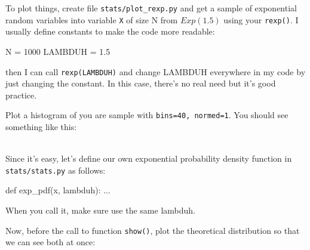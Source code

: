 \begin{fullwidth}
\step To plot things, create file {\tt stats/plot\_rexp.py} and get a sample of exponential random variables into variable {\tt X} of size N from $Exp(1.5)$ using your {\tt rexp()}. I usually define constants to make the code more readable:

\begin{pyverbatim}
N = 1000
LAMBDUH = 1.5
\end{pyverbatim}

\noindent then I can call {\tt rexp(LAMBDUH)} and change LAMBDUH everywhere in my code by just changing the constant. In this case, there's no real need but it's good practice.

\step  Plot a histogram of you are sample with {\tt bins=40, normed=1}.  You should see something like this:


\\

\step Since it's easy, let's define our own exponential probability density function in {\tt stats/stats.py} as follows:

\begin{pyverbatim}
def exp_pdf(x, lambduh):
    ...
\end{pyverbatim}

\noindent When you call it, make sure use the same lambduh.

\step Now, before the call to function {\tt show()}, plot the theoretical distribution so that we can see both at once:


\end{fullwidth}
